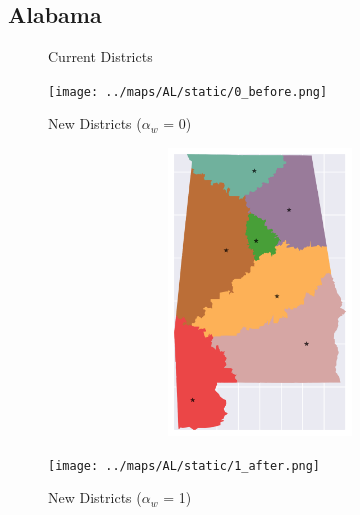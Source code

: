 \subsection{Alabama}
\begin{figure}[htb!] \centering
\caption{ Current Districts }
\texttt{[image: ../maps/AL/static/0\_before.png]}
\caption{ New Districts ($\alpha_w$ = 0) }
\includegraphics[width=5in,height=3in,keepaspectratio]{../maps/AL/static/0_after.png}
\caption{ New Districts ($\alpha_w$ = 1) }
\texttt{[image: ../maps/AL/static/1\_after.png]}
\end{figure}

\clearpage
\newpage

